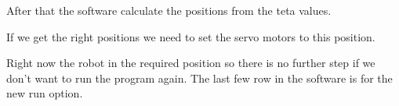 		
		
		\hspace{15pt}After that the software calculate the positions from the teta values.
		
		
		
		\hspace{15pt}If we get the right positions we need to set the servo motors to this position.
		
		
		
		\hspace{15pt}Right now the robot in the required position so there is no further step if we don't want to run the program again. The last few row in the software is for the new run option.
		
		
	
	